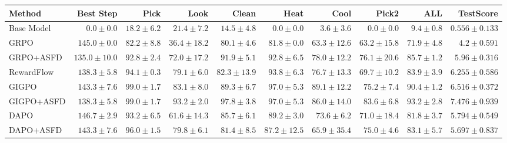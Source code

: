 \begin{tabular}{lrrrrrrrrr}
\toprule
Method & Best Step & Pick & Look & Clean & Heat & Cool & Pick2 & ALL & TestScore \\
\midrule
Base Model & $0.0 \pm 0.0$ & $18.2 \pm 6.2$ & $21.4 \pm 7.2$ & $14.5 \pm 4.8$ & $0.0 \pm 0.0$ & $3.6 \pm 3.6$ & $0.0 \pm 0.0$ & $9.4 \pm 0.8$ & $0.556 \pm 0.133$ \\
GRPO & $145.0 \pm 0.0$ & $82.2 \pm 8.8$ & $36.4 \pm 18.2$ & $80.1 \pm 4.6$ & $81.8 \pm 0.0$ & $63.3 \pm 12.6$ & $63.2 \pm 15.8$ & $71.9 \pm 4.8$ & $4.2 \pm 0.591$ \\
GRPO+ASFD & $135.0 \pm 10.0$ & $92.8 \pm 2.4$ & $72.0 \pm 17.2$ & $91.9 \pm 5.1$ & $92.8 \pm 6.5$ & $78.0 \pm 12.2$ & $76.1 \pm 20.6$ & $85.7 \pm 1.2$ & $5.96 \pm 0.316$ \\
RewardFlow & $138.3 \pm 5.8$ & $94.1 \pm 0.3$ & $79.1 \pm 6.0$ & $82.3 \pm 13.9$ & $93.8 \pm 6.3$ & $76.7 \pm 13.3$ & $69.7 \pm 10.2$ & $83.9 \pm 3.9$ & $6.255 \pm 0.586$ \\
GIGPO & $143.3 \pm 7.6$ & $99.0 \pm 1.7$ & $83.1 \pm 8.0$ & $89.3 \pm 6.7$ & $97.0 \pm 5.3$ & $89.1 \pm 12.2$ & $75.2 \pm 7.4$ & $90.4 \pm 1.2$ & $6.516 \pm 0.372$ \\
GIGPO+ASFD & $138.3 \pm 5.8$ & $99.0 \pm 1.7$ & $93.2 \pm 2.0$ & $97.8 \pm 3.8$ & $97.0 \pm 5.3$ & $86.0 \pm 14.0$ & $83.6 \pm 6.8$ & $93.2 \pm 2.8$ & $7.476 \pm 0.939$ \\
DAPO & $146.7 \pm 2.9$ & $93.2 \pm 6.5$ & $61.6 \pm 14.3$ & $85.7 \pm 6.1$ & $89.2 \pm 3.0$ & $73.6 \pm 6.2$ & $71.0 \pm 18.4$ & $81.8 \pm 3.7$ & $5.794 \pm 0.549$ \\
DAPO+ASFD & $143.3 \pm 7.6$ & $96.0 \pm 1.5$ & $79.8 \pm 6.1$ & $81.4 \pm 8.5$ & $87.2 \pm 12.5$ & $65.9 \pm 35.4$ & $75.0 \pm 4.6$ & $83.1 \pm 5.7$ & $5.697 \pm 0.837$ \\
\bottomrule
\end{tabular}
